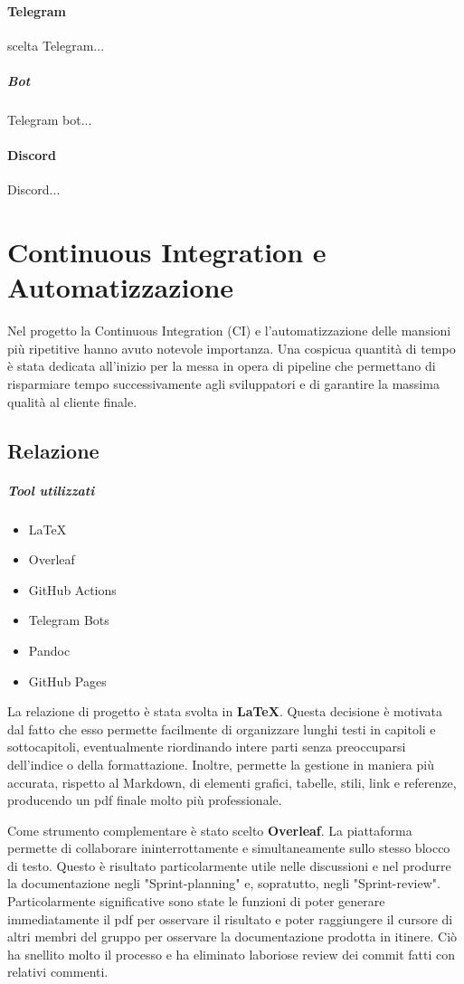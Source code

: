     \paragraph{Telegram}
    scelta Telegram...
        \subparagraph{Bot} 
        Telegram bot...
    
    \paragraph{Discord}
    Discord... 

\section{Continuous Integration e Automatizzazione}
\label{chap:CI}
Nel progetto la Continuous Integration (CI) e l'automatizzazione delle mansioni più ripetitive hanno avuto notevole importanza. Una cospicua quantità di tempo è stata dedicata all'inizio per la messa in opera di pipeline che permettano di risparmiare tempo successivamente agli sviluppatori e di garantire la massima qualità al cliente finale.
    \subsection{Relazione}
        \subparagraph{Tool utilizzati}
        \begin{itemize}
            \item \LaTeX
            \item Overleaf
            \item GitHub Actions
            \item Telegram Bots
            \item Pandoc
            \item GitHub Pages
        \end{itemize}
        La relazione di progetto è stata svolta in \textbf{\LaTeX}. Questa decisione è motivata dal fatto che esso permette facilmente di organizzare lunghi testi in capitoli e sottocapitoli, eventualmente riordinando intere parti senza preoccuparsi dell'indice o della formattazione. Inoltre, permette la gestione in maniera più accurata, rispetto al Markdown, di elementi grafici, tabelle, stili, link e referenze, producendo un pdf finale molto più professionale. 
        
        Come strumento complementare è stato scelto \textbf{Overleaf}. La piattaforma permette di collaborare ininterrottamente e simultaneamente sullo stesso blocco di testo. Questo è risultato particolarmente utile nelle discussioni e nel produrre la documentazione negli "Sprint-planning" e, sopratutto, negli "Sprint-review". Particolarmente significative sono state le funzioni di poter generare immediatamente il pdf per osservare il risultato e poter raggiungere il cursore di altri membri del gruppo per osservare la documentazione prodotta in itinere. Ciò ha snellito molto il processo e ha eliminato laboriose review dei commit fatti con relativi commenti.  

